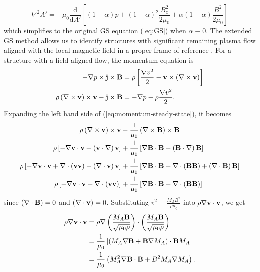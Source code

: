 \begin{equation}
    \nabla^2 A' = -\mu_0\frac{\mathrm{d}}{\mathrm{d}A'}\left[\left(1-\alpha\right)p + \left(1-\alpha\right)^2\frac{B_z^2}{2\mu_0} + \alpha\left(1-\alpha\right)\frac{B^2}{2\mu_0} \right]
    \label{eq:GSextended}
\end{equation}
which simplifies to the original GS equation (\ref{eq:GS}) when $\alpha\equiv 0$. The extended GS method allows us to identify structures with significant remaining plasma flow aligned with the local magnetic field in a proper frame of reference \citep{Chen:2022}. For a structure with a field-aligned flow, the momentum equation is
\begin{equation}
    \begin{split}
        -\nabla p \times \mathbf{j}\times\mathbf{B} &= \rho\left[ \frac{\nabla v^2}{2} - \mathbf{v}\times\left( \nabla \times\mathbf{v} \right) \right] \\
        \rho\left( \nabla \times\mathbf{v} \right)\times\mathbf{v} - \mathbf{j}\times\mathbf{B} &= -\nabla p -\rho\frac{\nabla v^2}{2}. \\
    \end{split}
    \label{eq:momentum-steady-state}
\end{equation}
Expanding the left hand side of (\ref{eq:momentum-steady-state}), it becomes
\[\begin{split}
    \rho\left( \nabla \times\mathbf{v} \right)\times\mathbf{v} &- \frac{1}{\mu_0}\left( \nabla \times\mathbf{B} \right)\times\mathbf{B} \\
    \rho \left[ -\nabla\mathbf{v}\cdot\mathbf{v} + \left( \mathbf{v}\cdot\nabla \right)\mathbf{v} \right] &+ \frac{1}{\mu_0}\left[ \nabla\mathbf{B}\cdot\mathbf{B} - \left( \mathbf{B}\cdot\nabla \right)\mathbf{B} \right] \\
    \rho \left[ -\nabla\mathbf{v}\cdot\mathbf{v} + \nabla \cdot\left( \mathbf{v}\mathbf{v} \right) -\left( \nabla \cdot\mathbf{v} \right)\mathbf{v} \right] &+ \frac{1}{\mu_0}\left[ \nabla\mathbf{B}\cdot\mathbf{B} - \nabla \cdot\left( \mathbf{B}\mathbf{B} \right) + \left( \nabla \cdot\mathbf{B} \right) \mathbf{B} \right] \\
    \rho \left[ -\nabla\mathbf{v}\cdot\mathbf{v} + \nabla \cdot\left( \mathbf{v}\mathbf{v} \right) \right] &+ \frac{1}{\mu_0}\left[ \nabla\mathbf{B}\cdot\mathbf{B} - \nabla \cdot\left( \mathbf{B}\mathbf{B} \right) \right] \\
\end{split}\]
since $\left( \nabla \cdot\mathbf{B} \right)=0$ and $\left( \nabla \cdot\mathbf{v} \right)=0$. Substituting $v^2 = \frac{M_A B^2}{\rho\mu_0}$ into $\rho\nabla\mathbf{v}\cdot\mathbf{v}$, we get
\[\begin{split}
    \rho\nabla\mathbf{v}\cdot\mathbf{v} &= \rho\nabla\left( \frac{M_A \mathbf{B}}{\sqrt{\mu_0\rho}} \right)\cdot\left( \frac{M_A \mathbf{B}}{\sqrt{\mu_0\rho}} \right) \\
    &= \frac{1}{\mu_0}\left[ \left( M_A\nabla\mathbf{B} + \mathbf{B}\nabla M_A \right)\cdot\mathbf{B} M_A \right] \\
    &= \frac{1}{\mu_0}\left( M_A^2\nabla\mathbf{B}\cdot\mathbf{B} + B^2 M_A\nabla M_A \right). \\
\end{split}\]
